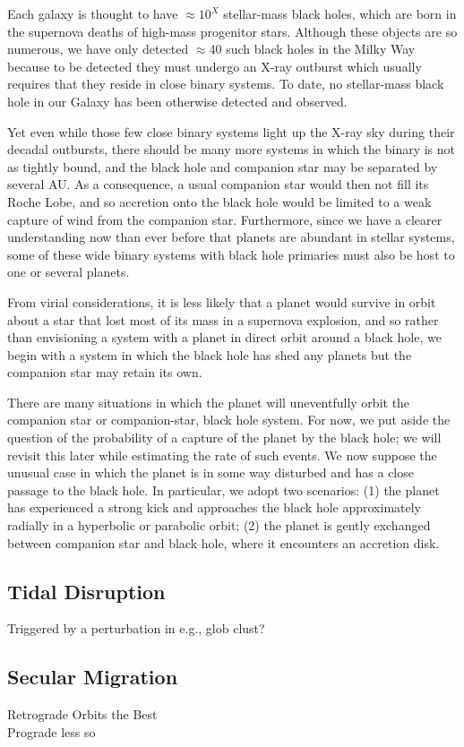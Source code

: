Each galaxy is thought to have $\approx 10^X$ stellar-mass black
holes, which are born in the supernova deaths of high-mass progenitor
stars.  Although these objects are so numerous, we have only detected
$\approx$40 such black holes in the Milky Way because to be detected
they must undergo an X-ray outburst which usually requires that they
reside in close binary systems.  To date, no stellar-mass black hole
in our Galaxy has been otherwise detected and observed.


Yet even while those few close binary systems light up the X-ray sky
during their decadal outbursts, there should be many more systems in
which the binary is not as tightly bound, and the black hole and
companion star may be separated by several AU.  As a consequence, a
usual companion star would then not fill its Roche Lobe, and so
accretion onto the black hole would be limited to a weak capture of
wind from the companion star.  Furthermore, since we have a clearer
understanding now than ever before that planets are abundant in
stellar systems, some of these wide binary systems with black hole
primaries must also be host to one or several planets.  


From virial considerations, it is less likely that a planet would
survive in orbit about a star that lost most of its mass in a
supernova explosion, and so rather than envisioning a system with a
planet in direct orbit around a black hole, we begin with a system in
which the black hole has shed any planets but the companion star may
retain its own.


There are many situations in which the planet will uneventfully orbit
the companion star or companion-star, black hole system.  For now, we
put aside the question of the probability of a capture of the planet
by the black hole; we will revisit this later while estimating the
rate of such events.  We now suppose the unusual case in which the
planet is in some way disturbed and has a close passage to the black
hole.  In particular, we adopt two scenarios: (1) the planet has
experienced a strong kick and approaches the black hole approximately
radially in a hyperbolic or parabolic orbit; (2) the planet is gently
exchanged between companion star and black hole, where it encounters
an accretion disk.


\subsection{Tidal Disruption}
Triggered by a perturbation in e.g., glob clust?


\subsection{Secular Migration}
Retrograde Orbits the Best\\
Prograde less so
